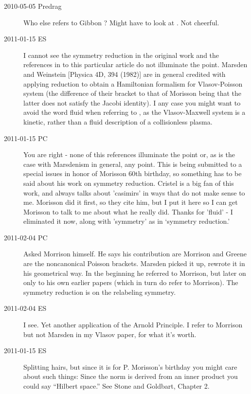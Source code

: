 \begin{description}
\item[2010-05-05  Predrag]
Who else refers to Gibbon
\etal{}? Might have to
look at . Not cheerful.

\item[2011-01-15 ES]
I cannot see the symmetry reduction in the original work and
the references in  to this particular article do not
illuminate the point. Marsden and Weinstein [Physica 4D, 394 (1982)] are
in general credited with applying reduction to obtain a Hamiltonian
formalism for Vlasov-Poisson system (the difference of their bracket to
that of Morisson being that the latter does not satisfy the Jacobi
identity). I any case you might want to avoid the word fluid when
referring to , as the Vlasov-Maxwell system is a kinetic,
rather than a fluid description of a collisionless plasma.


\item[2011-01-15 PC]
You are right - none of this references illuminate the point or, as is
the case with Marsdenism in general, any point. This is being submitted
to a special issues in honor of Morisson 60th birthday, so something has
to be said about his work on symmetry reduction. Cristel is a big fan of
this work, and always talks about 'casimirs' in ways that do not make
sense to me. Morisson did it first, so they cite him, but I put it here
so I can get Morisson to talk to me about what he really did. Thanks for
'fluid' - I eliminated it now, along with 'symmetry' as in `symmetry
reduction.'
\item[2011-02-04 PC]
Asked Morrison himself. He says his contribution are
Morrison and Greene are the
noncanonical Poisson brackets. Marsden picked it up, rewrote it
in his geometrical way. In
the beginning he referred to Morrison, but later on only to
his own earlier papers (which in turn do refer to Morrison).
The symmetry reduction is on the relabeling symmetry.

\item[2011-02-04 ES]
I see. Yet another application of the
 {Arnold
Principle}. I refer to Morrison but not Marsden in my Vlasov paper, for
what it's worth.


\item[2011-01-15 ES]
Splitting hairs, but since it is for P. Morisson's birthday you might
care about such things: Since the norm is derived from an inner product you
could say ``Hilbert space.'' See Stone and Goldbart, Chapter 2.


\end{description}
